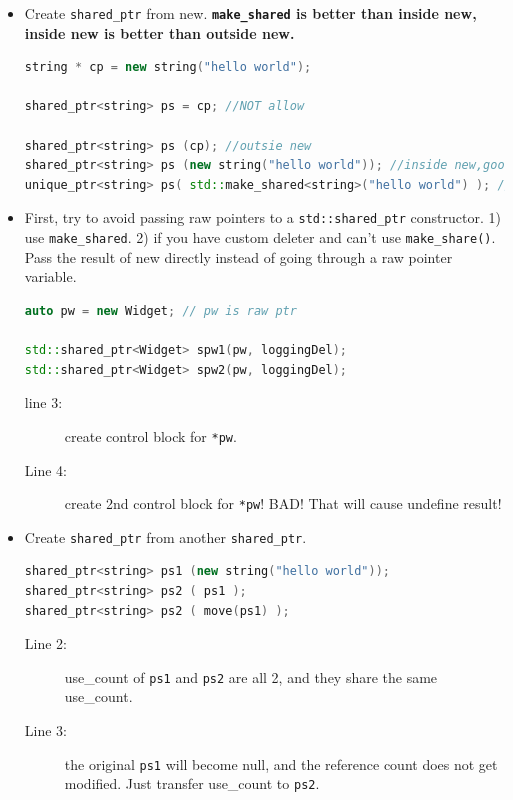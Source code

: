 \documentclass[a4paper,11pt,twoside]{book}
\begin{document}
\begin{itemize}
\begin{enumerate}
\end{enumerate}

	
    \item Create \texttt{shared\_ptr} from new. \textbf{\texttt{make\_shared} is better than inside new, inside new is better than outside new.}
\begin{lstlisting}[frame=single, language=c++]
string * cp = new string("hello world");

shared_ptr<string> ps = cp; //NOT allow

shared_ptr<string> ps (cp); //outsie new 
shared_ptr<string> ps (new string("hello world")); //inside new,good style
unique_ptr<string> ps( std::make_shared<string>("hello world") ); //make, best style
\end{lstlisting}

    \item First, try to avoid passing raw pointers to a \texttt{std::shared\_ptr} constructor. 1) use \texttt{make\_shared}. 2) if you have custom deleter and can't use \texttt{make\_share()}.  Pass the result of new directly instead of going through a raw pointer variable.

\begin{lstlisting}[frame=single, language=c++]
auto pw = new Widget; // pw is raw ptr

std::shared_ptr<Widget> spw1(pw, loggingDel);
std::shared_ptr<Widget> spw2(pw, loggingDel);
\end{lstlisting}
\begin{description}
	\item[line 3:] create control block for \texttt{*pw}.
	\item[Line 4:] create 2nd control block for \texttt{*pw}! BAD! That will cause undefine result!
\end{description}

\item Create \texttt{shared\_ptr} from another \texttt{shared\_ptr}.
\begin{lstlisting}[frame=single, language=c++, mathescape=true]
shared_ptr<string> ps1 (new string("hello world"));
shared_ptr<string> ps2 ( ps1 );
shared_ptr<string> ps2 ( move(ps1) );
\end{lstlisting}
\begin{description}
	\item[Line 2:] use\_count of \texttt{ps1} and \texttt{ps2} are all 2, and they share the same use\_count.
	\item[Line 3:] the original \texttt{ps1} will become null, and the reference count does not get modified. Just transfer use\_count to \texttt{ps2}. 
\end{description}


\end{itemize}
\end{document}
